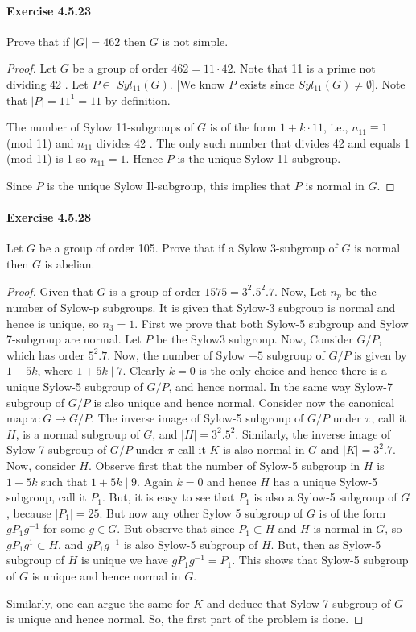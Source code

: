 \documentclass{article}
\theoremstyle{definition}
\begin{document}
\paragraph{Exercise 4.5.23} Prove that if $|G|=462$ then $G$ is not simple.
\begin{proof}
    Let $G$ be a group of order $462=11 \cdot 42$. Note that 11 is a prime not dividing 42 . Let $P \in$ $S y l_{11}(G)$. [We know $P$ exists since $S y l_{11}(G) \neq \emptyset$]. Note that $|P|=11^1=11$ by definition. 

The number of Sylow 11-subgroups of $G$ is of the form $1+k \cdot 11$, i.e., $n_{11} \equiv 1$ (mod 11) and $n_{11}$ divides 42 . The only such number that divides 42 and equals 1 (mod 11) is 1 so $n_{11}=1$. Hence $P$ is the unique Sylow 11-subgroup.

Since $P$ is the unique Sylow Il-subgroup, this implies that $P$ is normal in $G$.
\end{proof}



\paragraph{Exercise 4.5.28} Let $G$ be a group of order 105. Prove that if a Sylow 3-subgroup of $G$ is normal then $G$ is abelian.
\begin{proof}
    Given that $G$ is a group of order $1575=3^2 .5^2 .7$. Now, Let $n_p$ be the number of Sylow-p subgroups. It is given that Sylow-3 subgroup is normal and hence is unique, so $n_3=1$. First we prove that both Sylow-5 subgroup and Sylow 7-subgroup are normal. Let $P$ be the Sylow3 subgroup. Now, Consider $G / P$, which has order $5^2 .7$. Now, the number of Sylow $-5$ subgroup of $G / P$ is given by $1+5 k$, where $1+5 k \mid 7$. Clearly $k=0$ is the only choice and hence there is a unique Sylow-5 subgroup of $G / P$, and hence normal. In the same way Sylow-7 subgroup of $G / P$ is also unique and hence normal. Consider now the canonical map $\pi: G \rightarrow G / P$. The inverse image of Sylow-5 subgroup of $G / P$ under $\pi$, call it $H$, is a normal subgroup of $G$, and $|H|=3^2 .5^2$. Similarly, the inverse image of Sylow-7 subgroup of $G / P$ under $\pi$ call it $K$ is also normal in $G$ and $|K|=3^2 .7$. Now, consider $H$. Observe first that the number of Sylow-5 subgroup in $H$ is $1+5 k$ such that $1+5 k \mid 9$. Again $k=0$ and hence $H$ has a unique Sylow-5 subgroup, call it $P_1$. But, it is easy to see that $P_1$ is also a Sylow-5 subgroup of $G$, because $\left|P_1\right|=25$. But now any other Sylow 5 subgroup of $G$ is of the form $g P_1 g^{-1}$ for some $g \in G$. But observe that since $P_1 \subset H$ and $H$ is normal in $G$, so $g P_1 g^1 \subset H$, and $g P_1 g^{-1}$ is also Sylow-5 subgroup of $H$. But, then as Sylow-5 subgroup of $H$ is unique we have $g P_1 g^{-1}=P_1$. This shows that Sylow-5 subgroup of $G$ is unique and hence normal in $G$.

Similarly, one can argue the same for $K$ and deduce that Sylow-7 subgroup of $G$ is unique and hence normal. So, the first part of the problem is done.
\end{proof}
\end{document}
